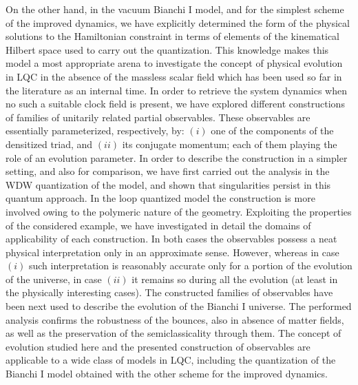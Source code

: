 On the other hand, in the vacuum Bianchi I model, and for the simplest scheme of the improved
dynamics, we have explicitly determined the form of the physical solutions to the Hamiltonian
constraint in
terms of elements of the kinematical Hilbert space used to carry out the quantization. This
knowledge makes this model a most appropriate arena to investigate the concept of physical
evolution in LQC in the absence of the massless scalar field which has been used so far in the
literature as an internal time. In order to retrieve the system dynamics when no such a suitable
clock field is present, we have explored different constructions of families of unitarily related
partial observables. These observables are essentially parameterized, respectively, by: $(i)$ one of
the components of the densitized triad, and $(ii)$ its conjugate momentum; each of them
playing the role of an evolution parameter. In order to describe the construction in a simpler
setting, and also for comparison, we have first carried out the analysis in the WDW
quantization of the model, and shown that singularities persist in this quantum approach. In the
loop quantized model the construction is more involved owing to the polymeric nature of the
geometry. Exploiting the properties of the considered example, we have investigated in detail the
domains of applicability of each construction. In both cases the observables possess a neat physical
interpretation only in an approximate sense. However, whereas in case $(i)$ such interpretation is
reasonably  accurate only for a portion of the evolution of the universe, in case $(ii)$ it remains
so during all the evolution (at least in the physically interesting cases). The constructed families
of observables have been next used to describe the evolution of the Bianchi I universe. The
performed
analysis confirms the robustness of the bounces, also in absence of matter fields, as well as the
preservation of the semiclassicality through them. The concept of evolution studied here and the
presented construction of observables are applicable to a wide class of models in LQC, including
the quantization of the Bianchi I model obtained with the other scheme for the improved
dynamics.

